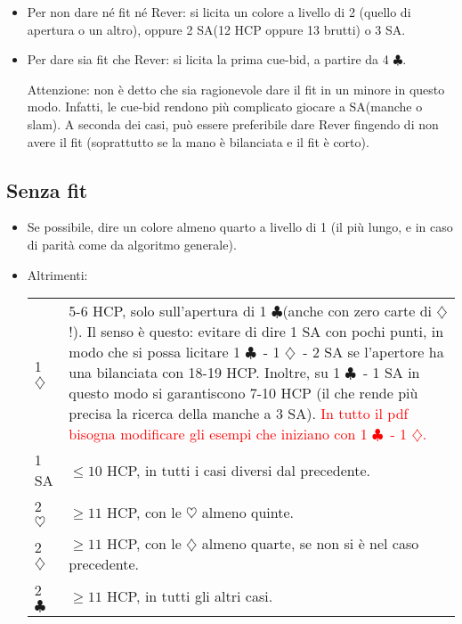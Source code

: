 \documentclass[a4paper,10pt]{article}
\renewcommand{\c}{$\clubsuit$\xspace}
\renewcommand{\d}{$\diamondsuit$\xspace}
\newcommand{\h}{$\heartsuit$\xspace}
\newcommand{\sa}{SA\xspace}
\newcommand{\smallspace}{\vskip0.3cm}
\newcommand{\note}[1]{\textcolor{red}{#1}}
\newenvironment{twocol}
  {\smallspace\noindent\begin{tabular}{l p{0.8\textwidth}}}
  {\end{tabular}\smallspace}
\begin{document}
\begin{itemize}
\begin{itemize}
  \item Per non dare né fit né Rever: si licita un colore a livello di 2 (quello di apertura o un altro), oppure 2 \sa (12 HCP oppure 13 brutti) o 3 \sa.
  
  \item Per dare sia fit che Rever: si licita la prima cue-bid, a partire da 4 \c.
  
  Attenzione: non è detto che sia ragionevole dare il fit in un minore in questo modo. Infatti, le cue-bid rendono più complicato giocare a \sa (manche o slam). A seconda dei casi, può essere preferibile dare Rever fingendo di non avere il fit (soprattutto se la mano è bilanciata e il fit è corto).
 \end{itemize}

\end{itemize}


\subsection{Senza fit}

\begin{itemize}
 \item Se possibile, dire un colore almeno quarto a livello di 1 (il pi\`u lungo, e in caso di parit\`a come da algoritmo generale).
 \item Altrimenti:
  \begin{twocol}
    1 \d & 5-6 HCP, solo sull'apertura di 1 \c (anche con zero carte di \d!). Il senso è questo: evitare di dire 1 \sa con pochi punti, in modo che si possa licitare 1 \c\ - 1 \d\ - 2 \sa se l'apertore ha una bilanciata con 18-19 HCP. Inoltre, su 1 \c\ - 1 \sa in questo modo si garantiscono 7-10 HCP (il che rende più precisa la ricerca della manche a 3 \sa). \note{In tutto il pdf bisogna modificare gli esempi che iniziano con 1 \c\ - 1 \d.}\\
    1 \sa & $\leq 10$ HCP, in tutti i casi diversi dal precedente. \\
    2 \h & $\geq 11$ HCP, con le \h almeno quinte.\\
    2 \d & $\geq 11$ HCP, con le \d almeno quarte, se non si è nel caso precedente.\\
    2 \c & $\geq 11$ HCP, in tutti gli altri casi.\\
  \end{twocol}
\end{itemize}
\end{document}
